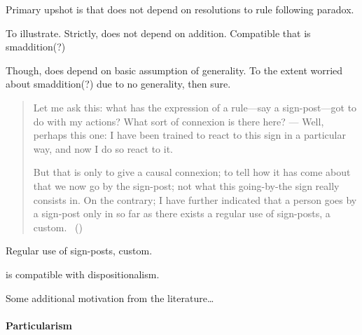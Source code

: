 \begin{note}
  Primary upshot is that \sR{} does not depend on resolutions to rule following paradox.

  To illustrate.
  Strictly, \sR{} does not depend on addition.
  Compatible that \sR{} is smaddition(?)

  Though, does depend on basic assumption of generality.
  To the extent worried about smaddition(?) due to no generality, then sure.
\end{note}

\begin{note}
  \begin{quote}
    Let me ask this: what has the expression of a rule—say a sign-post—got to do with my actions?
    What sort of connexion is there here?%
    ---%
    Well, perhaps this one:
    I have been trained to react to this sign in a particular way, and now I do so react to it.

    But that is only to give a causal connexion; to tell how it has come about that we now go by the sign-post; not what this going-by-the sign really consists in.
    On the contrary; I have further indicated that a person goes by a sign-post only in so far as there exists a regular use of sign-posts, a custom.%
    \mbox{ }\hfill\mbox{(\citeyear[\S198]{Wittgenstein:1958aa})}
  \end{quote}

  Regular use of sign-posts, custom.
\end{note}

\begin{note}
  \sR{} is compatible with dispositionalism.

\end{note}

\begin{note}
  Some additional motivation from the literature\dots
\end{note}

\paragraph{Particularism}

